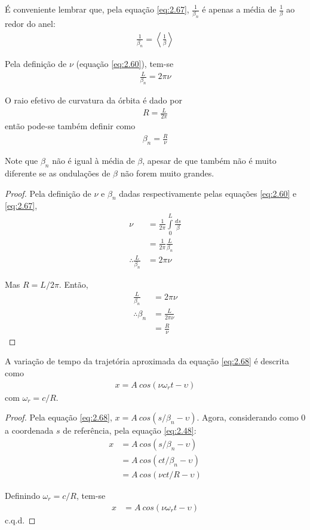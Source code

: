 É conveniente lembrar que, pela equação \eqref{eq:2.67}, $\frac{1}{\beta_n}$ é apenas a média de $\frac{1}{\beta}$ ao redor do anel:
\begin{align}
	\frac{1}{\beta_n} = \left \langle \frac{1}{\beta} \right \rangle
\end{align}

Pela definição de $\nu$ (equação \eqref{eq:2.60}), tem-se
\begin{align}
	\frac{L}{\beta_n} = 2\pi \nu
\end{align}

O raio efetivo de curvatura da órbita é dado por
\begin{align}
	R = \frac{L}{2\pi}
\end{align}
então pode-se também definir como
\begin{align}
	\beta_n = \frac{R}{\nu}
\end{align}

Note que $\beta_n$ não é igual à média de $\beta$, apesar de que também não é muito diferente se as ondulações de $\beta$ não forem muito grandes.

\begin{proof}
	Pela definição de $\nu$ e $\beta_n$ dadas respectivamente pelas equações \eqref{eq:2.60} e \eqref{eq:2.67},
	\begin{align*}
		\nu &= \frac{1}{2\pi} \int\limits_{0}^{L}\frac{ds}{\beta}\\
			&= \frac{1}{2\pi} \frac{L}{\beta_n}\\
		\therefore \frac{L}{\beta_n} &= 2\pi \nu
	\end{align*}
	
	Mas $R = L/2\pi$. Então,
	\begin{align*}
		\frac{L}{\beta_n} &= 2\pi \nu\\
		\therefore \beta_n &= \frac{L}{2\pi \nu}\\
						   &= \frac{R}{\nu}
	\end{align*}
\end{proof}

A variação de tempo da trajetória aproximada da equação \eqref{eq:2.68} é descrita como
\begin{align}
	x = A\ cos(\nu \omega_r t - \upsilon)
\end{align}
com $\omega_r = c/R$.

\begin{proof}
	Pela equação \eqref{eq:2.68}, $x = A\ cos(s/\beta_n - \upsilon)$. Agora, considerando como 0 a coordenada $s$ de referência, pela equação \eqref{eq:2.48}:
	\begin{align*}
		x &= A\ cos(s/\beta_n - \upsilon)\\
		  &= A\ cos(ct/\beta_n - \upsilon)\\
		  &= A\ cos(\nu c t/R - \upsilon)
	\end{align*}
	
	Definindo $\omega_r = c/R$, tem-se
	\begin{align*}
		x &= A\ cos(\nu \omega_r t - \upsilon)
	\end{align*}
	c.q.d.
\end{proof}

